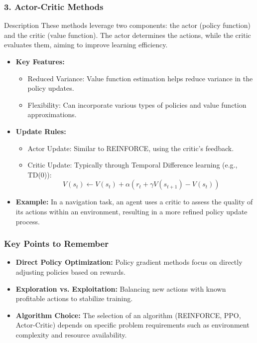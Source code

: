 \documentclass{beamer}
\begin{document}
\begin{frame}[fragile]
    \frametitle{3. Actor-Critic Methods}
    
    \begin{block}{Description}
        These methods leverage two components: the actor (policy function) and the critic (value function). The actor determines the actions, while the critic evaluates them, aiming to improve learning efficiency.
    \end{block}
    
    \begin{itemize}
        \item \textbf{Key Features:}
        \begin{itemize}
            \item Reduced Variance: Value function estimation helps reduce variance in the policy updates.
            \item Flexibility: Can incorporate various types of policies and value function approximations.
        \end{itemize}
        
        \item \textbf{Update Rules:}
        \begin{itemize}
            \item Actor Update: Similar to REINFORCE, using the critic's feedback.
            \item Critic Update: Typically through Temporal Difference learning (e.g., TD(0)):
            \begin{equation}
            V(s_t) \leftarrow V(s_t) + \alpha \left( r_t + \gamma V(s_{t+1}) - V(s_t) \right)
            \end{equation}
        \end{itemize}
        
        \item \textbf{Example:}
        In a navigation task, an agent uses a critic to assess the quality of its actions within an environment, resulting in a more refined policy update process.
    \end{itemize}
\end{frame}

\begin{frame}[fragile]
    \frametitle{Key Points to Remember}

    \begin{itemize}
        \item \textbf{Direct Policy Optimization:}
        Policy gradient methods focus on directly adjusting policies based on rewards.
        \item \textbf{Exploration vs. Exploitation:}
        Balancing new actions with known profitable actions to stabilize training.
        \item \textbf{Algorithm Choice:}
        The selection of an algorithm (REINFORCE, PPO, Actor-Critic) depends on specific problem requirements such as environment complexity and resource availability.
    \end{itemize}
\end{frame}
\end{document}
